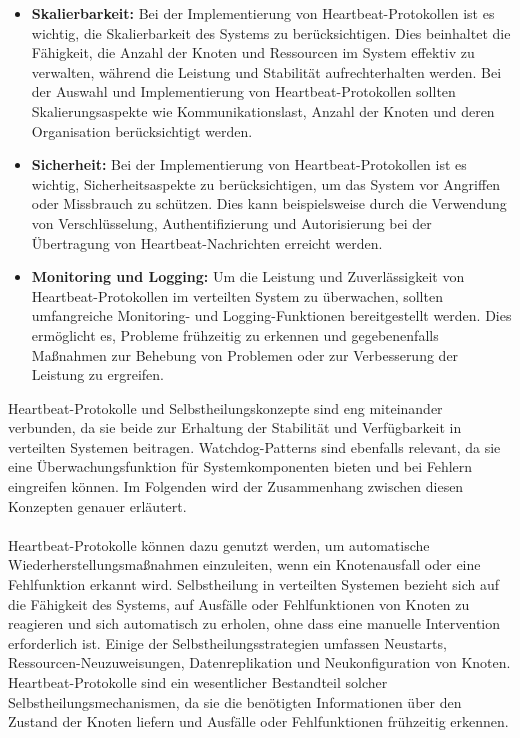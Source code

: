 \documentclass[../vs-script-first-v01.tex]{subfiles}
\begin{document}
\begin{itemize}
\item \textbf{Skalierbarkeit:} Bei der Implementierung von Heartbeat-Protokollen ist es wichtig, die Skalierbarkeit des Systems zu berücksichtigen. Dies beinhaltet die Fähigkeit, die Anzahl der Knoten und Ressourcen im System effektiv zu verwalten, während die Leistung und Stabilität aufrechterhalten werden. Bei der Auswahl und Implementierung von Heartbeat-Protokollen sollten Skalierungsaspekte wie Kommunikationslast, Anzahl der Knoten und deren Organisation berücksichtigt werden.
\item \textbf{Sicherheit:} Bei der Implementierung von Heartbeat-Protokollen ist es wichtig, Sicherheitsaspekte zu berücksichtigen, um das System vor Angriffen oder Missbrauch zu schützen. Dies kann beispielsweise durch die Verwendung von Verschlüsselung, Authentifizierung und Autorisierung bei der Übertragung von Heartbeat-Nachrichten erreicht werden.
\item \textbf{Monitoring und Logging:} Um die Leistung und Zuverlässigkeit von Heartbeat-Protokollen im verteilten System zu überwachen, sollten umfangreiche Monitoring- und Logging-Funktionen bereitgestellt werden. Dies ermöglicht es, Probleme frühzeitig zu erkennen und gegebenenfalls Maßnahmen zur Behebung von Problemen oder zur Verbesserung der Leistung zu ergreifen.
\end{itemize} 

Heartbeat-Protokolle und Selbstheilungskonzepte sind eng miteinander verbunden, da sie beide zur Erhaltung der Stabilität und Verfügbarkeit in verteilten Systemen beitragen. Watchdog-Patterns sind ebenfalls relevant, da sie eine Überwachungsfunktion für Systemkomponenten bieten und bei Fehlern eingreifen können. Im Folgenden wird der Zusammenhang zwischen diesen Konzepten genauer erläutert.
\\\\
Heartbeat-Protokolle können dazu genutzt werden, um automatische Wiederherstellungsmaßnahmen einzuleiten, wenn ein Knotenausfall oder eine Fehlfunktion erkannt wird. Selbstheilung in verteilten Systemen bezieht sich auf die Fähigkeit des Systems, auf Ausfälle oder Fehlfunktionen von Knoten zu reagieren und sich automatisch zu erholen, ohne dass eine manuelle Intervention erforderlich ist. Einige der Selbstheilungsstrategien umfassen Neustarts, Ressourcen-Neuzuweisungen, Datenreplikation und Neukonfiguration von Knoten. Heartbeat-Protokolle sind ein wesentlicher Bestandteil solcher Selbstheilungsmechanismen, da sie die benötigten Informationen über den Zustand der Knoten liefern und Ausfälle oder Fehlfunktionen frühzeitig erkennen.
\end{document}
